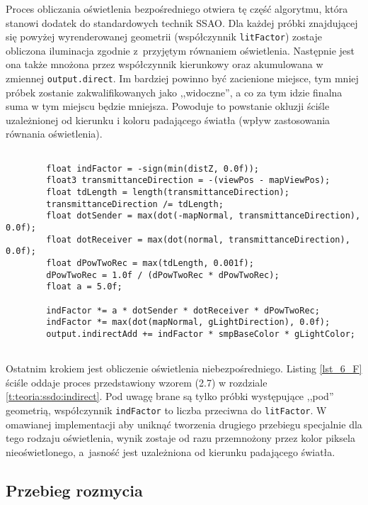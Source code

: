 		Proces obliczania oświetlenia bezpośredniego otwiera tę część algorytmu, która stanowi dodatek do standardowych technik SSAO. Dla każdej próbki znajdującej się powyżej wyrenderowanej geometrii (współczynnik \texttt{litFactor}) zostaje obliczona iluminacja zgodnie z~przyjętym równaniem oświetlenia. Następnie jest ona także mnożona przez współczynnik kierunkowy oraz akumulowana w zmiennej \texttt{output.direct}. Im bardziej powinno być zacienione miejsce, tym mniej próbek zostanie zakwalifikowanych jako ,,widoczne'', a co za tym idzie finalna suma w tym miejscu będzie mniejsza. Powoduje to powstanie okluzji ściśle uzależnionej od kierunku i koloru padającego światła (wpływ zastosowania równania oświetlenia).
		
		\begin{lstlisting}[language=HLSL,caption={Obliczenie oświetlenia pośredniego SSDO-B.},label={lst_6_F}]
		
		float indFactor = -sign(min(distZ, 0.0f));
		float3 transmittanceDirection = -(viewPos - mapViewPos);
		float tdLength = length(transmittanceDirection);
		transmittanceDirection /= tdLength;
		float dotSender = max(dot(-mapNormal, transmittanceDirection), 0.0f);
		float dotReceiver = max(dot(normal, transmittanceDirection), 0.0f);
		float dPowTwoRec = max(tdLength, 0.001f);
		dPowTwoRec = 1.0f / (dPowTwoRec * dPowTwoRec);
		float a = 5.0f;
		
		indFactor *= a * dotSender * dotReceiver * dPowTwoRec;
		indFactor *= max(dot(mapNormal, gLightDirection), 0.0f);
		output.indirectAdd += indFactor * smpBaseColor * gLightColor;
		
		\end{lstlisting}
		
		Ostatnim krokiem jest obliczenie oświetlenia niebezpośredniego. Listing \ref{lst_6_F} ściśle oddaje proces przedstawiony wzorem (2.7) w rozdziale \ref{t:teoria:ssdo:indirect}. Pod uwagę brane są tylko próbki występujące ,,pod'' geometrią, współczynnik \texttt{indFactor} to liczba przeciwna do \texttt{litFactor}. W omawianej implementacji aby uniknąć tworzenia drugiego przebiegu specjalnie dla tego rodzaju oświetlenia, wynik zostaje od razu przemnożony przez kolor piksela nieoświetlonego, a~jasność jest uzależniona od kierunku padającego światła.
	
	\subsection{Przebieg rozmycia}
	\label{t:impl:a:pass2}
	
